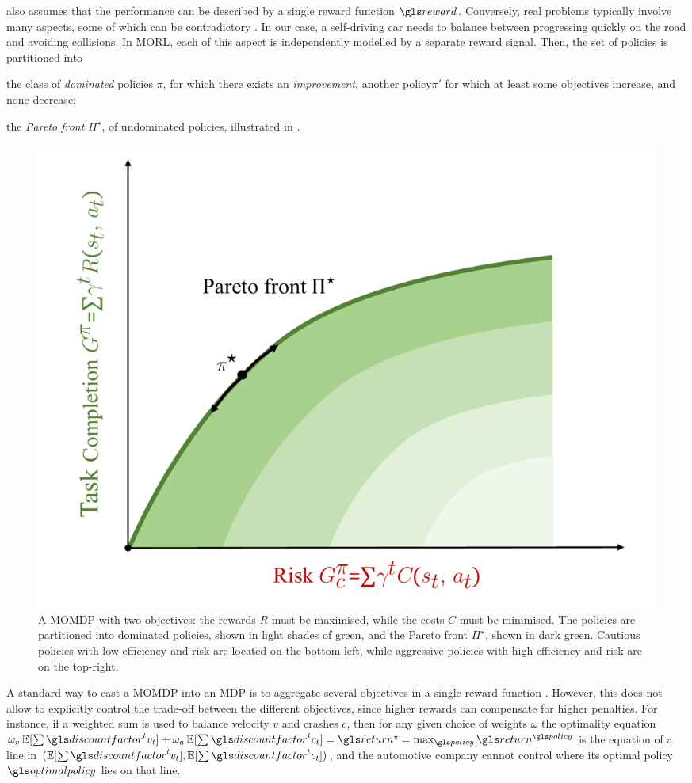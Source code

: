  also assumes that the performance can be described by a single reward function $\reward$. Conversely, real problems typically involve many aspects, some of which can be contradictory \citep{Liu2014}. In our case, a self-driving car needs to balance between progressing quickly on the road and avoiding collisions. In \gls{MORL}, each of this aspect is independently modelled by a separate reward signal. Then, the set of policies is partitioned into 
\begin{enumerate*}[label=(\roman*)]
	\item the class of \emph{dominated} policies $\pi$, for which there exists an \emph{improvement}, \ie another policy$\pi'$ for which at least some objectives increase, and none decrease;
	\item the \emph{Pareto front} $\Pi^\star$, of undominated policies, illustrated in .
\end{enumerate*}

\begin{figure}[ht]
\centering
\includegraphics[width=0.55\linewidth]{img/pareto1}
\caption{A \gls{MOMDP} with two objectives: the rewards $R$ must be maximised, while the costs $C$ must be minimised. The policies are partitioned into dominated policies, shown in light shades of green, and the Pareto front $\Pi^\star$, shown in dark green. Cautious policies with low efficiency and risk are located on the bottom-left, while aggressive policies with high efficiency and risk are on the top-right.}
\label{fig:pareto-front}
\end{figure}

A standard way to cast a \gls{MOMDP} into an \gls{MDP} is to aggregate several objectives in a single reward function \citep{Roijers2013ASO}. However, this does not allow to explicitly control the trade-off between the different objectives, since higher rewards can compensate for higher penalties. For instance, if a weighted sum is used to balance velocity $v$ and crashes $c$, then for any given choice of weights $\omega$ the optimality equation $\omega_v\expectedvalue[\sum\discountfactor^t v_t] + \omega_a\expectedvalue[\sum\discountfactor^t c_t] = \return^{\star} = \max_{\policy} \return^{\policy}$ is the equation of a line in $(\expectedvalue[\sum\discountfactor^t v_t], \expectedvalue[\sum\discountfactor^t c_t])$, and the automotive company cannot control where its optimal policy $\optimalpolicy$ lies on that line. 

